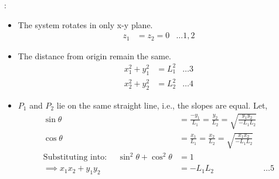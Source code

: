 :
\begin{itemize}
    \item The system rotates in only x-y plane.
        \begin{align*}
            z_1 &= z_2 = 0 &\hdots 1, 2
        \end{align*}
    \item The distance from origin remain the same.
    \begin{align*}
        x_1^2 + y_1^2 &= L_1^2  &\hdots 3\\
        x_2^2 + y_2^2 &= L_2^2  &\hdots 4
    \end{align*}

    \item $P_1$ and $P_2$ lie on the same straight line, i.e., the slopes are equal. Let,
    \begin{align*}
        \sin \theta &= \frac{-y_1}{L_1} = \frac{y_2}{L_2} = \sqrt{\frac{y_1 y_2}{-L_1 L_2}}\\
        \cos \theta &=  \frac{x_1}{L_1} = \frac{x_2}{L_2} = \sqrt{\frac{x_1 x_2}{-L_1 L_2}}\\
        \text{Substituting into: }\quad
        \sin^2 \theta + \cos^2 \theta &= 1\\
        \implies x_1 x_2 + y_1 y_2 &= -L_1 L_2 &\hdots 5
    \end{align*}
\end{itemize}
